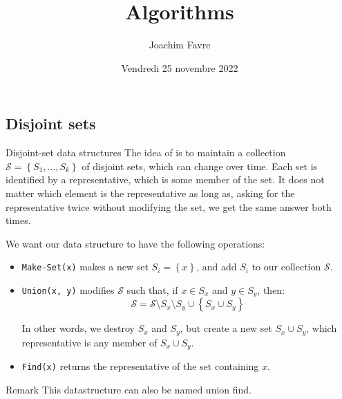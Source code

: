 \documentclass[a4paper]{article}
\title{Algorithms}
\author{Joachim Favre}
\date{Vendredi 25 novembre 2022}
\begin{document}
\maketitle


\subsection{Disjoint sets}
\begin{parag}{Disjoint-set data structures}
    The idea of  is to maintain a collection $\mathcal{S} = \left\{S_1, \ldots, S_k\right\}$ of disjoint sets, which can change over time. Each set is identified by a representative, which is some member of the set. It does not matter which element is the representative as long as, asking for the representative twice without modifying the set, we get the same answer both times.

    We want our data structure to have the following operations:
    \begin{itemize}
        \item \texttt{Make-Set(x)} makes a new set $S_i = \left\{x\right\}$, and add $S_i$ to our collection $\mathcal{S}$.
        \item \texttt{Union(x, y)} modifies $\mathcal{S}$ such that, if $x \in S_x$ and $y \in S_y$, then:
        \[\mathcal{S} = \mathcal{S} \setminus S_x \setminus S_y \cup \left\{S_x \cup S_y\right\}\]

        In other words, we destroy $S_x$ and $S_y$, but create a new set $S_x \cup S_y$, which representative is any member of $S_x \cup S_y$.
        
        \item \texttt{Find(x)} returns the representative of the set containing $x$.
    \end{itemize}

    \begin{subparag}{Remark}
        This datastructure can also be named union find.
    \end{subparag}
\end{parag}
\end{document}
